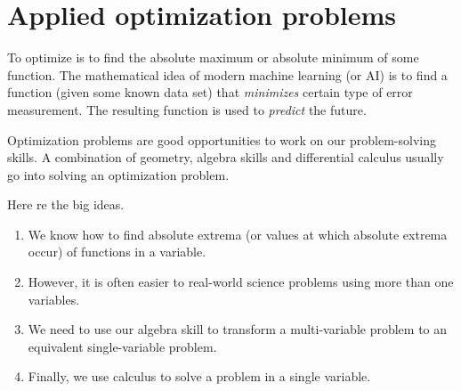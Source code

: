 \documentclass[../main.tex]{subfiles}
\begin{document}
 \section{Applied optimization problems}
  To optimize is to find the absolute maximum or absolute minimum of some function. The mathematical idea of modern machine learning (or AI) is to find a function (given some known data set) that \emph{minimizes} certain type of error measurement. The resulting function is used to \emph{predict} the future.

  Optimization problems are good opportunities to work on our problem-solving skills. A combination of geometry, algebra skills and differential calculus usually go into solving an optimization problem.

  Here re the big ideas.
  \begin{enumerate}[label=(\alph*)]
    \item We know how to find absolute extrema (or values at which absolute extrema occur) of functions in a  variable.

    \item However, it is often easier to  real-world science problems using more than one variables.

    \item We need to use our algebra skill to transform a multi-variable problem to an equivalent single-variable problem.

    \item Finally, we use calculus to solve a problem in a single variable.
  \end{enumerate}
\end{document}
